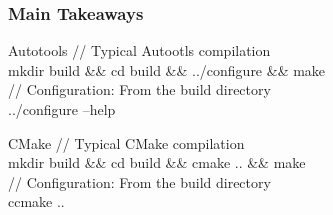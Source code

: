 \documentclass{beamer}
\begin{document}
\begin{frame}[fragile] \frametitle{Main Takeaways}
      
      \begin{block}{Autotools}
        // Typical Autootls compilation  \\
        mkdir build \&\& cd build \&\& ../configure \&\& make  \\
        // Configuration: From the build directory \\
        ../configure --help 
      \end{block}
      \begin{block}{CMake}
        // Typical CMake compilation  \\
        mkdir build \&\& cd build \&\& cmake .. \&\& make  \\
        // Configuration: From the build directory \\
        ccmake ..
      \end{block}
\end{frame}
\end{document}
